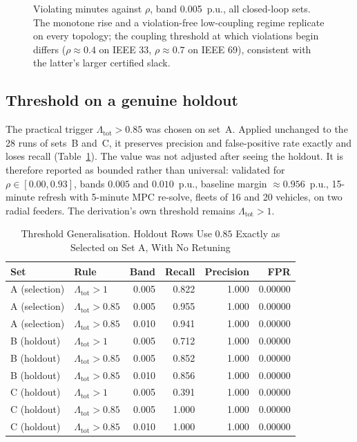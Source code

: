 \documentclass[lettersize,journal]{IEEEtran}
\newcommand{\Lamt}{\Lambda_{\mathrm{tot}}}
\begin{document}
\begin{figure}[!t]\centering

\caption{Violating minutes against $\rho$, band 0.005~p.u., all closed-loop
sets. The monotone rise and a violation-free low-coupling regime replicate on
every topology; the coupling threshold at which violations begin differs
($\rho\approx0.4$ on IEEE 33, $\rho\approx0.7$ on IEEE 69), consistent with the
latter's larger certified slack.}
\label{fig:closedloop}
\end{figure}

\subsection{Threshold on a genuine holdout}\label{sec:holdout}
The practical trigger $\Lamt>0.85$ was chosen on set~A. Applied unchanged to
the 28 runs of sets~B and~C, it preserves precision and false-positive rate
exactly and loses recall (Table~\ref{tab:holdout}). The value was not adjusted
after seeing the holdout. It is therefore reported as bounded rather than
universal: validated for $\rho\in[0.00,0.93]$, bands $0.005$ and $0.010$~p.u.,
baseline margin $\approx 0.956$~p.u., 15-minute refresh with 5-minute MPC
re-solve, fleets of 16 and 20 vehicles, on two radial feeders. The derivation's
own threshold remains $\Lamt>1$.

\begin{table}[!t]
\renewcommand{\arraystretch}{1.15}
\caption{Threshold Generalisation. Holdout Rows Use $0.85$ Exactly as Selected
on Set A, With No Retuning}
\label{tab:holdout}
\centering\footnotesize
\begin{tabular}{@{}llrrrr@{}}
\toprule
Set & Rule & Band & Recall & Precision & FPR\\
\midrule
A (selection) & $\Lamt>1$    & 0.005 & 0.822 & 1.000 & 0.00000\\
A (selection) & $\Lamt>0.85$ & 0.005 & 0.955 & 1.000 & 0.00000\\
A (selection) & $\Lamt>0.85$ & 0.010 & 0.941 & 1.000 & 0.00000\\
\midrule
B (holdout)   & $\Lamt>1$    & 0.005 & 0.712 & 1.000 & 0.00000\\
B (holdout)   & $\Lamt>0.85$ & 0.005 & 0.852 & 1.000 & 0.00000\\
B (holdout)   & $\Lamt>0.85$ & 0.010 & 0.856 & 1.000 & 0.00000\\
C (holdout)   & $\Lamt>1$    & 0.005 & 0.391 & 1.000 & 0.00000\\
C (holdout)   & $\Lamt>0.85$ & 0.005 & 1.000 & 1.000 & 0.00000\\
C (holdout)   & $\Lamt>0.85$ & 0.010 & 1.000 & 1.000 & 0.00000\\
\bottomrule
\end{tabular}
\end{table}
\end{document}

